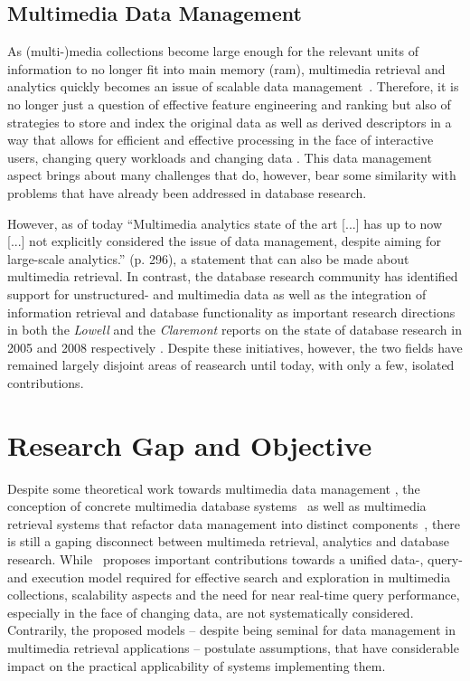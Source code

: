 \subsection{Multimedia Data Management}

As (multi-)media collections become large enough for the relevant units of information to no longer fit into main memory (\acrshort{ram}), multimedia retrieval and analytics quickly becomes an issue of scalable data management~\cite{Jonson:2016Ten,Pouyanfar:2018}. Therefore, it is no longer just a question of effective feature engineering and ranking but also of strategies to store and index the original data as well as derived descriptors in a way that allows for efficient and effective processing in the face of interactive users, changing query workloads and changing data \cite{Smeulders:2000Content}. This data management aspect brings about many challenges that do, however, bear some similarity with problems that have already been addressed in database research.

However, as of today ``Multimedia analytics state of the art [...] has up to now [...] not explicitly considered the issue of data management, despite aiming for large-scale analytics.'' \cite{Jonson:2016Ten} (p. 296), a statement that can also be made about multimedia retrieval. In contrast, the database research community has identified support for unstructured- and multimedia data as well as the integration of information retrieval and database functionality as important research directions in both the \emph{Lowell} and the \emph{Claremont} reports on the state of database research in 2005 and 2008 respectively \cite{Abiteboul:2005Lowell,Agrawal:2008Claremont}. Despite these initiatives, however, the two fields have remained largely disjoint areas of reasearch until today, with only a few, isolated contributions.

\section{Research Gap and Objective}
\label{section:research_gap}

Despite some theoretical work towards multimedia data management \cite{Marcus:1996Foundations,Adjeroh:1997Multimedia}, the conception of concrete multimedia database systems~\cite{Giangreco:2016Adam,Yang:2020Pase,Wang:2021Milvus} as well as multimedia retrieval systems that refactor data management into distinct components~\cite{Carey:1995Towards,Rossetto:2016Vitrivr,Gasser:2019Multimodal}, there is still a gaping disconnect between multimeda retrieval, analytics and database research. While~\cite{Giangreco:2018Database} proposes important contributions towards a unified data-, query- and execution model required for effective search and exploration in multimedia collections, scalability aspects and the need for near real-time query performance, especially in the face of changing data, are not systematically considered. Contrarily, the proposed models -- despite being seminal for data management in multimedia retrieval applications -- postulate assumptions, that have considerable impact on the practical applicability of systems implementing them.

